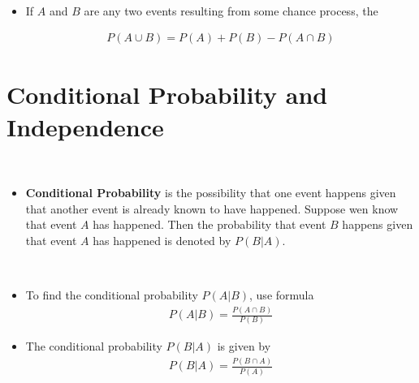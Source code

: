 \documentclass[Main.tex]{subfiles}
\begin{document}
	\begin{example} \hfill \\
		\begin{itemize}	
			\item If $A$ and $B$ are any two events resulting from some chance process, the
			\begin{definition}
			\begin{subequations}
				\begin{align}
				P(A\cup B)=P(A)+P(B)-P(A\cap B)	
				\end{align}
			\end{subequations}
			\end{definition}\hfill									
		\end{itemize}
	\end{example}	
										
	
	\section{Conditional Probability and Independence}
	
	\begin{exercise} \hfill \\
		\begin{itemize}	
			\item \textbf{Conditional Probability} is the possibility that one event happens given that another event is already known to have happened.
			Suppose wen know that event $A$ has happened. Then the probability that event $B$ happens given that event $A$ has happened is denoted by $P(B|A)$.		
		\end{itemize}
	\end{exercise}
	
	\begin{exercise} \hfill \\
		\begin{itemize}	
			\item To find the conditional probability $P(A|B)$, use formula
			\begin{subequations}
				\begin{align}
				P(A|B)=\frac{P(A\cap B)}{P(B)}
				\end{align}
			\end{subequations}	
			\item The conditional probability $P(B|A)$ is given by
			\begin{subequations}
				\begin{align}
				P(B|A)=\frac{P(B\cap A)}{P(A)}
				\end{align}
			\end{subequations}		
		\end{itemize}
	\end{exercise}
	
\end{document}
